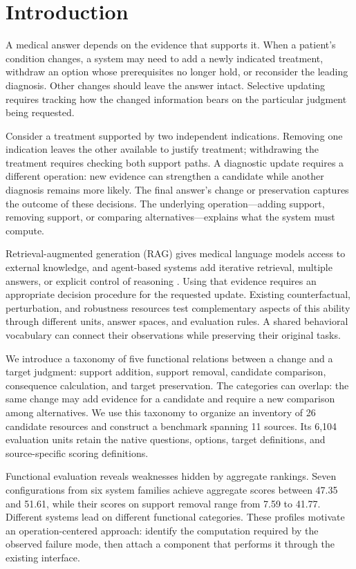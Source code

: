 \section{Introduction}
\label{sec:introduction}

A medical answer depends on the evidence that supports it. When a patient's condition changes, a system may need to add a newly indicated treatment, withdraw an option whose prerequisites no longer hold, or reconsider the leading diagnosis. Other changes should leave the answer intact. Selective updating requires tracking how the changed information bears on the particular judgment being requested.

Consider a treatment supported by two independent indications. Removing one indication leaves the other available to justify treatment; withdrawing the treatment requires checking both support paths. A diagnostic update requires a different operation: new evidence can strengthen a candidate while another diagnosis remains more likely. The final answer's change or preservation captures the outcome of these decisions. The underlying operation---adding support, removing support, or comparing alternatives---explains what the system must compute.

Retrieval-augmented generation (RAG) gives medical language models access to external knowledge, and agent-based systems add iterative retrieval, multiple answers, or explicit control of reasoning \citep{xiong2024medrag,li2026medrgag,wu2026marag,jiang2025tcrag}. Using that evidence requires an appropriate decision procedure for the requested update. Existing counterfactual, perturbation, and robustness resources test complementary aspects of this ability through different units, answer spaces, and evaluation rules. A shared behavioral vocabulary can connect their observations while preserving their original tasks.

We introduce a taxonomy of five functional relations between a change and a target judgment: support addition, support removal, candidate comparison, consequence calculation, and target preservation. The categories can overlap: the same change may add evidence for a candidate and require a new comparison among alternatives. We use this taxonomy to organize an inventory of 26 candidate resources and construct a benchmark spanning 11 sources. Its 6,104 evaluation units retain the native questions, options, target definitions, and source-specific scoring definitions.

Functional evaluation reveals weaknesses hidden by aggregate rankings. Seven configurations from six system families achieve aggregate scores between 47.35 and 51.61, while their scores on support removal range from 7.59 to 41.77. Different systems lead on different functional categories. These profiles motivate an operation-centered approach: identify the computation required by the observed failure mode, then attach a component that performs it through the existing interface.

